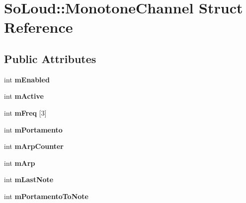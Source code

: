 \hypertarget{struct_so_loud_1_1_monotone_channel}{}\section{So\+Loud\+:\+:Monotone\+Channel Struct Reference}
\label{struct_so_loud_1_1_monotone_channel}
\subsection*{Public Attributes}
\begin{DoxyCompactItemize}
\item 
\mbox{\label{struct_so_loud_1_1_monotone_channel_a602555f7e6902a92b02cfe919c7429fc}} 
int {\bfseries m\+Enabled}
\item 
\mbox{\label{struct_so_loud_1_1_monotone_channel_a6be325ad129edc512a8844927d5fdcd9}} 
int {\bfseries m\+Active}
\item 
\mbox{\label{struct_so_loud_1_1_monotone_channel_acce03d2e79a05ea63be8f30051aebecd}} 
int {\bfseries m\+Freq} \mbox{[}3\mbox{]}
\item 
\mbox{\label{struct_so_loud_1_1_monotone_channel_a21a22b01af45aeac2897e1f98bbfb6ac}} 
int {\bfseries m\+Portamento}
\item 
\mbox{\label{struct_so_loud_1_1_monotone_channel_a6663c37a5a349c11af0f1c1b82172ee2}} 
int {\bfseries m\+Arp\+Counter}
\item 
\mbox{\label{struct_so_loud_1_1_monotone_channel_aae4e6376ce89d269496f046851b12bc8}} 
int {\bfseries m\+Arp}
\item 
\mbox{\label{struct_so_loud_1_1_monotone_channel_aecc61199b4a97561b44e1c70c0f45b7a}} 
int {\bfseries m\+Last\+Note}
\item 
\mbox{\label{struct_so_loud_1_1_monotone_channel_a3b224d2b41bfaa83737824c3fb932164}} 
int {\bfseries m\+Portamento\+To\+Note}

\end{DoxyCompactItemize}
